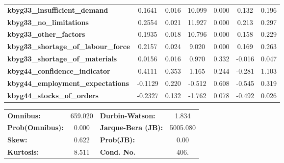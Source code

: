 \begin{center}
\begin{tabular}{lcccccc}
\textbf{kbyg33\_insufficient\_demand}        &       0.1641  &        0.016     &    10.099  &         0.000        &        0.132    &        0.196     \\
\textbf{kbyg33\_no\_limitations}             &       0.2554  &        0.021     &    11.927  &         0.000        &        0.213    &        0.297     \\
\textbf{kbyg33\_other\_factors}              &       0.1935  &        0.018     &    10.796  &         0.000        &        0.158    &        0.229     \\
\textbf{kbyg33\_shortage\_of\_labour\_force} &       0.2157  &        0.024     &     9.020  &         0.000        &        0.169    &        0.263     \\
\textbf{kbyg33\_shortage\_of\_materials}     &       0.0156  &        0.016     &     0.970  &         0.332        &       -0.016    &        0.047     \\
\textbf{kbyg44\_confidence\_indicator}       &       0.4111  &        0.353     &     1.165  &         0.244        &       -0.281    &        1.103     \\
\textbf{kbyg44\_employment\_expectations}    &      -0.1129  &        0.220     &    -0.512  &         0.608        &       -0.545    &        0.319     \\
\textbf{kbyg44\_stocks\_of\_orders}          &      -0.2327  &        0.132     &    -1.762  &         0.078        &       -0.492    &        0.026     \\
\bottomrule
\end{tabular}
\begin{tabular}{lclc}
\textbf{Omnibus:}       & 659.020 & \textbf{  Durbin-Watson:     } &    1.834  \\
\textbf{Prob(Omnibus):} &   0.000 & \textbf{  Jarque-Bera (JB):  } & 5005.080  \\
\textbf{Skew:}          &   0.622 & \textbf{  Prob(JB):          } &     0.00  \\
\textbf{Kurtosis:}      &   8.511 & \textbf{  Cond. No.          } &     406.  \\
\bottomrule
\end{tabular}
\end{center}